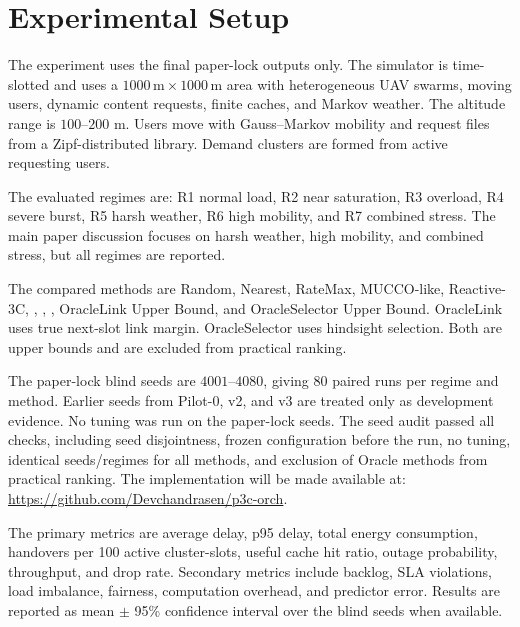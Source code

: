 \section{Experimental Setup}
The experiment uses the final paper-lock outputs only. The simulator is time-slotted and uses a $1000\,\mathrm{m}\times1000\,\mathrm{m}$ area with heterogeneous UAV swarms, moving users, dynamic content requests, finite caches, and Markov weather. The altitude range is $100$--$200$ m. Users move with Gauss--Markov mobility and request files from a Zipf-distributed library. Demand clusters are formed from active requesting users.

The evaluated regimes are: R1 normal load, R2 near saturation, R3 overload, R4 severe burst, R5 harsh weather, R6 high mobility, and R7 combined stress. The main paper discussion focuses on harsh weather, high mobility, and combined stress, but all regimes are reported.

The compared methods are Random, Nearest, RateMax, MUCCO-like, Reactive-3C, \pclr, \psr, \etp, OracleLink Upper Bound, and OracleSelector Upper Bound. OracleLink uses true next-slot link margin. OracleSelector uses hindsight selection. Both are upper bounds and are excluded from practical ranking.

The paper-lock blind seeds are $4001$--$4080$, giving 80 paired runs per regime and method. Earlier seeds from Pilot-0, v2, and v3 are treated only as development evidence. No tuning was run on the paper-lock seeds. The seed audit passed all checks, including seed disjointness, frozen configuration before the run, no tuning, identical seeds/regimes for all methods, and exclusion of Oracle methods from practical ranking. The implementation will be made available at: \url{https://github.com/Devchandrasen/p3c-orch}. %

The primary metrics are average delay, p95 delay, total energy consumption, handovers per 100 active cluster-slots, useful cache hit ratio, outage probability, throughput, and drop rate. Secondary metrics include backlog, SLA violations, load imbalance, fairness, computation overhead, and predictor error. Results are reported as mean $\pm$ 95\% confidence interval over the blind seeds when available.

